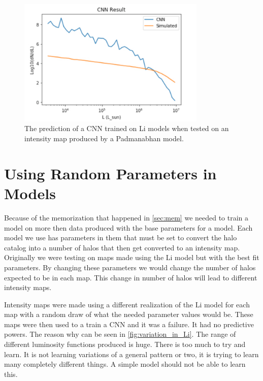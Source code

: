 \documentclass{article}
\begin{document}
		\begin{figure}[H]
			\centering
			\includegraphics[width=0.8\textwidth]{Li_Model_with_Padmanabhan.pdf}
			\caption{The prediction of a CNN trained on Li models when tested on an intensity map produced by a Padmanabhan model.}
			\label{fig:Li_Model_with_Padmanabhan}
		\end{figure}

	\section{Using Random Parameters in Models} \label{sec:rand}
		Because of the memorization that happened in \cref{sec:mem} we needed to train a model on more then data produced with the base parameters for a model.  Each model we use has parameters in them that must be set to convert the halo catalog into a number of halos that then get converted to an intensity map.  Originally we were testing on maps made using the Li model but with the best fit parameters.  By changing these parameters we would change the number of halos expected to be in each map.  This change in number of halos will lead to different intensity maps.

		Intensity maps were made using a different realization of the Li model for each map with a random draw of what the needed parameter values would be.  These maps were then used to a train a CNN and it was a failure.  It had no predictive powers.  The reason why can be seen in \cref{fig:variation_in_Li}.  The range of different luminosity functions produced is huge.  There is too much to try and learn.  It is not learning variations of a general pattern or two, it is trying to learn many completely different things.  A simple model should not be able to learn this.
\end{document}
